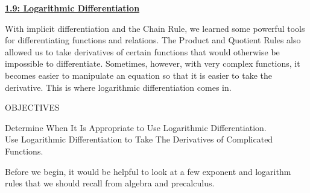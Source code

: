 \textbf{\underline{\large{1.9: Logarithmic Differentiation}}} \par

With implicit differentiation and the Chain Rule, we learned some powerful tools for differentiating functions and relations. The Product and Quotient Rules also allowed us to take derivatives of certain functions that would otherwise be impossible to differentiate. Sometimes, however, with very complex functions, it becomes easier to manipulate an equation so that it is easier to take the derivative. This is where logarithmic differentiation comes in. \par

\begin{tcolorbox}[objective]
    \begin{center}
        OBJECTIVES \\[11pt]
    \end{center}
    Determine When It Is Appropriate to Use Logarithmic Differentiation. \\
    Use Logarithmic Differentiation to Take The Derivatives of Complicated Functions.
\end{tcolorbox}

Before we begin, it would be helpful to look at a few exponent and logarithm rules that we should recall from algebra and precalculus. 

\begin{center}
\end{center}